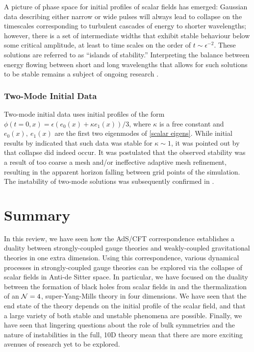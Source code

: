 \documentclass[../PhD.tex]{subfiles}
\begin{document}
A picture of phase space for initial profiles of scalar fields has emerged: Gaussian data describing either narrow or wide pulses will always lead to collapse on the timescales corresponding to turbulent cascades of energy to shorter wavelengths; however, there is a set of intermediate widths that exhibit stable behaviour below some critical amplitude, at least to time scales on the order of $t \sim \epsilon^{-2}$. These solutions are referred to as ``islands of stability.'' Interpreting the balance between energy flowing between short and long wavelengths that allows for such solutions to be stable remains a subject of ongoing research \cite{1507.08261, TTF, 1706.07413, 1912.07143}.

\subsubsection{Two-Mode Initial Data}

Two-mode initial data uses initial profiles of the form $\phi(t=0,x) = \epsilon ( e_0 (x) + \kappa e_1 (x) )/3$, where $\kappa$ is a free constant and $e_0(x), \: e_1(x)$ are the first two eigenmodes of \eqref{scalar eigens}. While initial results by \cite{1403.6471} indicated that such data was stable for $\kappa \sim 1$, it was pointed out by \cite{1410.2631} that  collapse did indeed occur. It was postulated that the observed stability was a result of too coarse a mesh and/or ineffective adaptive mesh refinement, resulting in the apparent horizon falling between grid points of the simulation. The instability of two-mode solutions was subsequently confirmed in \cite{1508.02709}.


\section{Summary}
\label{sec: summary}

In this review, we have seen how the AdS/CFT correspondence establishes a duality between strongly-coupled gauge theories and weakly-coupled gravitational theories in one extra dimension. Using this correspondence, various dynamical processes in strongly-coupled gauge theories can be explored via the collapse of scalar fields in Anti-de Sitter space. In particular, we have focused on the duality between the formation of black holes from scalar fields in \ads and the thermalization of an $\mathcal N = 4$, super-Yang-Mills theory in four dimensions. We have seen that the end state of the theory depends on the initial profile of the scalar field, and that a large variety of both stable and unstable phenomena are possible. Finally, we have seen that lingering questions about the role of bulk symmetries and the nature of instabilities in the full, 10D theory mean that there are more exciting avenues of research yet to be explored.
\end{document}
